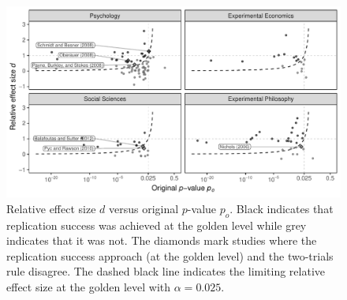 \begin{figure}[!h]
\centering
\begin{knitrout}
\color{fgcolor}

{\centering \includegraphics[width=\maxwidth]{images/paper2/fig6-1}

}


\end{knitrout}
\caption{Relative effect size $d$ versus original $p$-value $p_o$. Black
  indicates that replication success was achieved at the golden level while grey
  indicates that it was not. The diamonds mark studies where the replication
  success approach (at the golden level) and the two-trials rule disagree. The
  dashed black line indicates the limiting relative effect size at the golden
  level with $\alpha = 0.025$. }
\label{fig2:fig6}
\end{figure}


